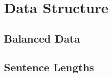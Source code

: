 \section{Data Structure}
\label{sec:data_stricture}

  \subsection{Balanced Data}
  \label{sec:balanced_data}

  \subsection{Sentence Lengths}
  \label{sec:sentence_lengths}
